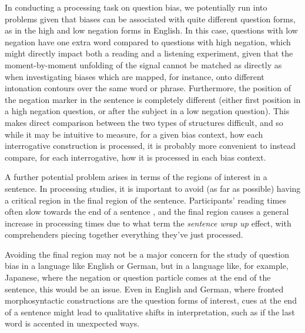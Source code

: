 \documentclass[output=paper,colorlinks,citecolor=brown]{langscibook}
\begin{document}
In conducting a processing task on question bias, we potentially run into problems given that biases can be associated with quite different question forms, as in the high and low negation forms in English. In this case, questions with low negation have one extra word compared to questions with high negation, which might directly impact both a reading and a listening experiment, given that the moment-by-moment unfolding of the signal cannot be matched as directly as when investigating biases which are mapped, for instance, onto different intonation contours over the same word or phrase. Furthermore, the position of the negation marker in the sentence is completely different (either first position in a high negation question, or after the subject in a low negation question). This makes direct comparison between the two types of structures difficult, and so while it may be intuitive to measure, for a given bias context, how each interrogative construction is processed, it is probably more convenient to instead compare, for each interrogative, how it is processed in each bias context.


A further potential problem arises in terms of the regions of interest in a sentence. In processing studies, it is important to avoid (as far as possible) having a critical region in the final region of the sentence. Participants' reading times often slow towards the end of a sentence \citep{Conklin2016}, and the final region causes a general increase in processing times due to what \citet{Just1982} term the \textit{sentence wrap up} effect, with comprehenders piecing together everything they've just processed. 

Avoiding the final region may not be a major concern for the study of question bias in a language like English or German, but in a language like, for example, Japanese, where the negation or question particle comes at the end of the sentence, this would be an issue. Even in English and German, where fronted morphosyntactic constructions are the question forms of interest, cues at the end of a sentence might lead to qualitative shifts in interpretation, such as if the last word is accented in unexpected ways.
\end{document}
